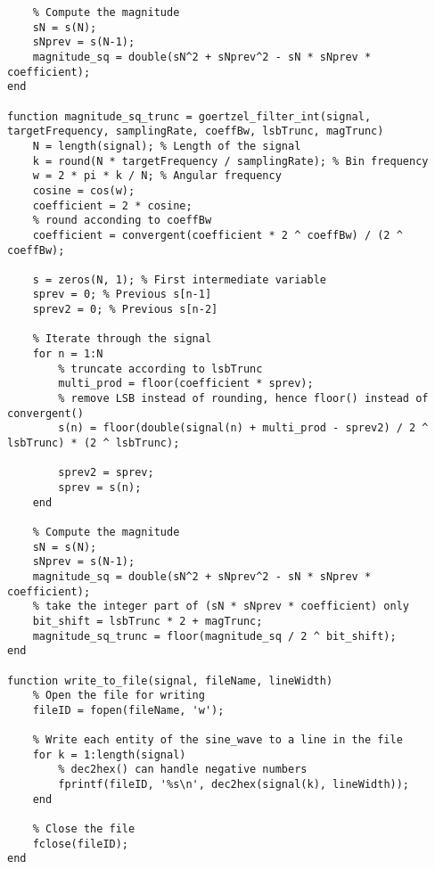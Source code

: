 \begin{lstlisting}
    % Compute the magnitude
    sN = s(N);
    sNprev = s(N-1);
    magnitude_sq = double(sN^2 + sNprev^2 - sN * sNprev * coefficient);
end

function magnitude_sq_trunc = goertzel_filter_int(signal, targetFrequency, samplingRate, coeffBw, lsbTrunc, magTrunc)
    N = length(signal); % Length of the signal
    k = round(N * targetFrequency / samplingRate); % Bin frequency
    w = 2 * pi * k / N; % Angular frequency
    cosine = cos(w);
    coefficient = 2 * cosine;
    % round acconding to coeffBw
    coefficient = convergent(coefficient * 2 ^ coeffBw) / (2 ^ coeffBw);

    s = zeros(N, 1); % First intermediate variable
    sprev = 0; % Previous s[n-1]
    sprev2 = 0; % Previous s[n-2]

    % Iterate through the signal
    for n = 1:N
        % truncate according to lsbTrunc
        multi_prod = floor(coefficient * sprev);
        % remove LSB instead of rounding, hence floor() instead of convergent()
        s(n) = floor(double(signal(n) + multi_prod - sprev2) / 2 ^ lsbTrunc) * (2 ^ lsbTrunc);

        sprev2 = sprev;
        sprev = s(n);
    end

    % Compute the magnitude
    sN = s(N);
    sNprev = s(N-1);
    magnitude_sq = double(sN^2 + sNprev^2 - sN * sNprev * coefficient);
    % take the integer part of (sN * sNprev * coefficient) only
    bit_shift = lsbTrunc * 2 + magTrunc;
    magnitude_sq_trunc = floor(magnitude_sq / 2 ^ bit_shift);
end

function write_to_file(signal, fileName, lineWidth)
    % Open the file for writing
    fileID = fopen(fileName, 'w');

    % Write each entity of the sine_wave to a line in the file
    for k = 1:length(signal)
        % dec2hex() can handle negative numbers
        fprintf(fileID, '%s\n', dec2hex(signal(k), lineWidth));
    end

    % Close the file
    fclose(fileID);
end
\end{lstlisting}
